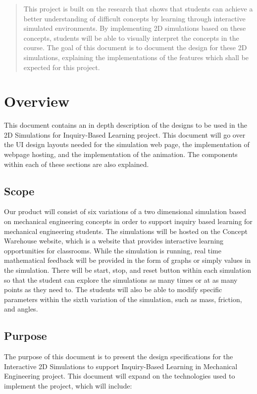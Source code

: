 \documentclass[onecolumn, draftclsnofoot,10pt, compsoc]{IEEEtran}
\begin{document}
\begin{titlepage}
\begin{singlespace}
\begin{abstract}
This project is built on the research that shows that students can achieve a better understanding of difficult concepts by learning through interactive simulated environments.
By implementing 2D simulations based on these concepts, students will be able to visually interpret the concepts in the course.
The goal of this document is to document the design for these 2D simulations, explaining the implementations of the features which shall be expected for this project.
        \end{abstract}     
    \end{singlespace}
\end{titlepage}
\newpage
{}
\tableofcontents
\clearpage

\section{Overview}
This document contains an in depth description of the designs to be used in the 2D Simulations for Inquiry-Based Learning project. This document will go over the UI design layouts needed for the simulation web page, the implementation of webpage hosting, and the implementation of the animation. The components within each of these sections are also explained. 

\subsection{Scope}
Our product will consist of six variations of a two dimensional simulation based on mechanical engineering concepts in order to support inquiry based learning for mechanical engineering students. The simulations will be hosted on the Concept Warehouse website, which is a website that provides interactive learning opportunities for classrooms. While the simulation is running, real time mathematical feedback will be provided in the form of graphs or simply values in the simulation. There will be start, stop, and reset button within each simulation so that the student can explore the simulations as many times or at as many points as they need to. The students will also be able to modify specific parameters within the sixth variation of the simulation, such as mass, friction, and angles.

\subsection{Purpose}
The purpose of this document is to present the design specifications for the Interactive 2D Simulations to support Inquiry-Based Learning in Mechanical Engineering project. This document will expand on the technologies used to implement the project, which will include:
\end{document}
